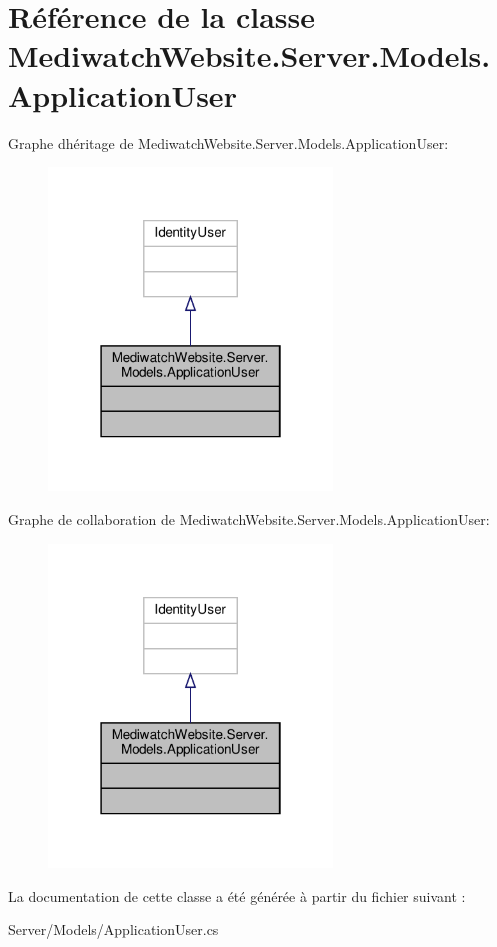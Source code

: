 \hypertarget{class_mediwatch_website_1_1_server_1_1_models_1_1_application_user}{}\section{Référence de la classe Mediwatch\+Website.\+Server.\+Models.\+Application\+User}
\label{class_mediwatch_website_1_1_server_1_1_models_1_1_application_user}


Graphe d\textquotesingle{}héritage de Mediwatch\+Website.\+Server.\+Models.\+Application\+User\+:
\nopagebreak
\begin{figure}[H]
\begin{center}
\leavevmode
\includegraphics[width=214pt]{class_mediwatch_website_1_1_server_1_1_models_1_1_application_user__inherit__graph}
\end{center}
\end{figure}


Graphe de collaboration de Mediwatch\+Website.\+Server.\+Models.\+Application\+User\+:
\nopagebreak
\begin{figure}[H]
\begin{center}
\leavevmode
\includegraphics[width=214pt]{class_mediwatch_website_1_1_server_1_1_models_1_1_application_user__coll__graph}
\end{center}
\end{figure}


La documentation de cette classe a été générée à partir du fichier suivant \+:\begin{DoxyCompactItemize}
\item 
Server/\+Models/Application\+User.\+cs\end{DoxyCompactItemize}
